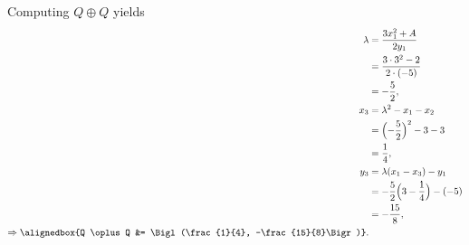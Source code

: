 \documentclass[
  coursecode={MTHE 418},
  assignmentname={Homework \homeworknumber},
  studentnumber=20053722,
  name={Bryan Hoang},
  draft,
]{
  ltxanswer%
}
\begin{document}
\begin{questions}
\begin{parts}
\begin{solution}
        Computing \(Q \oplus Q\) yields
        \begin{align*}
          \lambda                            &= \frac{3x_{1}^{2} + A}{2y_{1}}                   \\
                                             &= \frac{3 \cdot 3^{2} - 2}{2 \cdot (-5)}          \\
                                             &= -\frac{5}{2},                                   \\
          x_{3}                              &= \lambda^{2} - x_{1} - x_{2}                     \\
                                             &= \Bigl(-\frac{5}{2}\Bigr)^{2} - 3 - 3            \\
                                             &= \frac{1}{4},                                    \\
          y_{3}                              &= \lambda(x_{1} - x_{3}) - y_{1}                  \\
                                             &= -\frac{5}{2} \Bigl(3 - \frac{1}{4}\Bigr) - (-5) \\
                                             &= -\frac{15}{8},                                  \\
          \Rightarrow \alignedbox{Q \oplus Q &= \Bigl(\frac{1}{4}, -\frac{15}{8}\Bigr)}.
        \end{align*}
      \end{solution}


\end{parts}
\end{questions}
\end{document}
